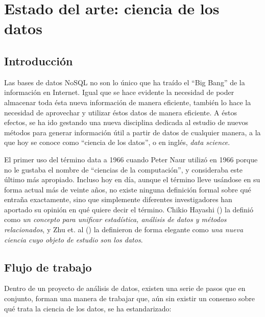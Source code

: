 \section{Estado del arte: ciencia de los datos}
\label{sec:state_dataScience}

\subsection{Introducción}
\label{subsec:state_dataScience_intro}

Las bases de datos NoSQL no son lo único que ha traído el ``Big Bang'' de la
información en Internet. Igual que se hace evidente la necesidad de
poder almacenar toda ésta nueva información de manera eficiente, también lo hace
la necesidad de aprovechar y utilizar éstos datos de manera eficiente. A éstos
efectos, se ha ido gestando una nueva disciplina dedicada al estudio de nuevos métodos para generar información útil a partir de datos de
cualquier manera, a la que hoy se conoce como ``ciencia de los datos'', o en
inglés, \emph{data science}.

El primer uso del término data a 1966 cuando Peter Naur utilizó en 1966
porque no le gustaba el nombre de  ``ciencias de la computación'', y consideraba
este último más apropiado. Incluso hoy en día, aunque el término lleve usándose en su forma actual más de veinte
años, no existe ninguna definición formal sobre qué entraña exactamente, sino
que simplemente diferentes investigadores han aportado su opinión en
qué quiere decir el término. Chikio Hayashi (\cite{Hayashi1998}) la definió como
\emph{un concepto para unificar estadística, análisis de datos y métodos
  relacionados}, y Zhu et. al (\cite{Zhu2011}) la definieron de forma elegante
como \emph{una nueva ciencia cuyo objeto de estudio son los datos}. 


\subsection{Flujo de trabajo}
\label{subsec:state_dataScience_workflow}

Dentro de un proyecto de análisis de datos, existen una serie de pasos que en
conjunto, forman una manera de trabajar que, aún sin existir un consenso sobre
qué trata la ciencia de los datos, se ha estandarizado:

